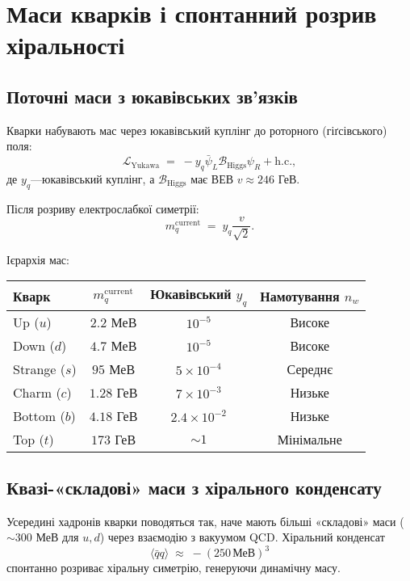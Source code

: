 \documentclass[11pt,a4paper]{article}
\newcommand{\Biv}{\mathcal{B}}
\newcommand{\Lag}{\mathcal{L}}
\theoremstyle{definition}
\theoremstyle{plain}
\theoremstyle{remark}
\begin{document}
\section{Маси кварків і спонтанний розрив хіральності}
\label{sec:quark-masses}

\subsection{Поточні маси з юкавівських зв’язків}

Кварки набувають мас через юкавівський куплінг до роторного (гіґсівського) поля:
\begin{equation}
\Lag_{\mathrm{Yukawa}} \;=\; -y_q \bar{\psi}_L \Biv_{\mathrm{Higgs}} \psi_R + \text{h.c.},
\label{eq:quark-yukawa}
\end{equation}
де $y_q$—юкавівський куплінг, а $\Biv_{\mathrm{Higgs}}$ має ВЕВ $v\approx 246$ ГеВ.

Після розриву електрослабкої симетрії:
\begin{equation}
m_q^{\mathrm{current}} \;=\; y_q \frac{v}{\sqrt{2}}.
\label{eq:current-mass}
\end{equation}

Ієрархія мас:
\begin{center}
\begin{tabular}{lccc}
\toprule
Кварк & $m_q^{\mathrm{current}}$ & Юкавівський $y_q$ & Намотування $n_w$ \\
\midrule
Up ($u$)     & $2{.}2$ МеВ   & $10^{-5}$ & Високе \\
Down ($d$)   & $4{.}7$ МеВ   & $10^{-5}$ & Високе \\
Strange ($s$)& $95$ МеВ      & $5\times 10^{-4}$ & Середнє \\
Charm ($c$)  & $1{.}28$ ГеВ  & $7\times 10^{-3}$ & Низьке \\
Bottom ($b$) & $4{.}18$ ГеВ  & $2{.}4\times 10^{-2}$ & Низьке \\
Top ($t$)    & $173$ ГеВ     & $\sim 1$ & Мінімальне \\
\bottomrule
\end{tabular}
\end{center}

\subsection{Квазі-«складові» маси з хірального конденсату}

Усередині хадронів кварки поводяться так, наче мають більші «складові» маси ($\sim 300$ МеВ для $u,d$) через взаємодію з вакуумом QCD. Хіральний конденсат
\begin{equation}
\langle \bar{q}q \rangle \;\approx\; -(250\,\text{МеВ})^3
\end{equation}
спонтанно розриває хіральну симетрію, генеруючи динамічну масу.
\end{document}
